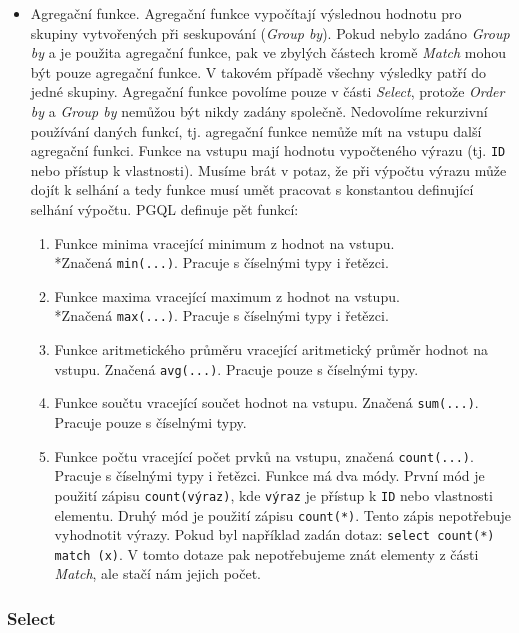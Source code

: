 \begin{itemize}
\item 
Agregační funkce.
Agregační funkce vypočítají výslednou hodnotu pro skupiny vytvořených při seskupování (\textit{Group by}).
Pokud nebylo zadáno \textit{Group by} a je použita agregační funkce, pak ve zbylých částech kromě \textit{Match} mohou být pouze agregační funkce.
V takovém případě všechny výsledky patří do jedné skupiny.
Agregační funkce povolíme pouze v části \textit{Select}, protože \textit{Order by} a \textit{Group by} nemůžou být nikdy zadány společně.
Nedovolíme rekurzivní používání daných funkcí, tj. agregační funkce nemůže mít na vstupu další agregační funkci.
Funkce na vstupu mají hodnotu vypočteného výrazu (tj. \texttt{ID} nebo přístup k vlastnosti).
Musíme brát v potaz, že při výpočtu výrazu může dojít k selhání a tedy funkce musí umět pracovat s konstantou definující selhání výpočtu.
PGQL definuje pět funkcí:
\begin{enumerate}
\item Funkce minima vracející minimum z hodnot na vstupu. 
\\*Značená \texttt{min(...)}.
Pracuje s číselnými typy i řetězci.
\item Funkce maxima vracející maximum z hodnot na vstupu. 
\\*Značená \texttt{max(...)}.
Pracuje s číselnými typy i řetězci.
\item Funkce aritmetického průměru vracející aritmetický průměr hodnot na vstupu.
Značená \texttt{avg(...)}.
Pracuje pouze s číselnými typy.
\item Funkce součtu vracející součet hodnot na vstupu. Značená \texttt{sum(...)}.
Pracuje pouze s číselnými typy.
\item Funkce počtu vracející počet prvků na vstupu, značená \texttt{count(...)}.
Pracuje s číselnými typy i řetězci.
Funkce má dva módy.
První mód je použití zápisu \texttt{count(výraz)}, kde \texttt{výraz} je přístup k \texttt{ID} nebo vlastnosti elementu.
Druhý mód je použití zápisu \texttt{count(*)}.
Tento zápis nepotřebuje vyhodnotit výrazy.
Pokud byl například zadán dotaz:
\texttt{select count(*) match (x)}.
V tomto dotaze pak nepotřebujeme znát elementy z části \textit{Match}, ale stačí nám jejich počet.
\end{enumerate}
\end{itemize}

\subsubsection{Select}

